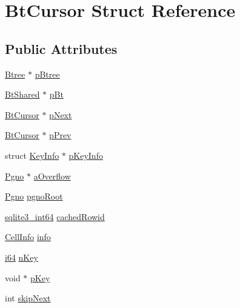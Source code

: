 \hypertarget{struct_bt_cursor}{\section{Bt\-Cursor Struct Reference}
\label{struct_bt_cursor}
}
\subsection*{Public Attributes}
\begin{DoxyCompactItemize}
\item 
\hyperlink{struct_btree}{Btree} $\ast$ \hyperlink{struct_bt_cursor_a2ad810542eaf99c9919c585624bead6f}{p\-Btree}
\item 
\hyperlink{struct_bt_shared}{Bt\-Shared} $\ast$ \hyperlink{struct_bt_cursor_a61c245712549192f7644e5ac23c00b74}{p\-Bt}
\item 
\hyperlink{struct_bt_cursor}{Bt\-Cursor} $\ast$ \hyperlink{struct_bt_cursor_ad2f8fe3aa7d3fa3309692b3e8a8c2395}{p\-Next}
\item 
\hyperlink{struct_bt_cursor}{Bt\-Cursor} $\ast$ \hyperlink{struct_bt_cursor_ac4f788ee88f252ddfcef8804674c7c90}{p\-Prev}
\item 
struct \hyperlink{struct_key_info}{Key\-Info} $\ast$ \hyperlink{struct_bt_cursor_ad2360bda13f959ed70672eb421fdb5ec}{p\-Key\-Info}
\item 
\hyperlink{sqlite3_8c_aec0c653e8dd16e4639caf2f8ea54f55c}{Pgno} $\ast$ \hyperlink{struct_bt_cursor_ae2dbcc15e63d349774a7ad6caef4d096}{a\-Overflow}
\item 
\hyperlink{sqlite3_8c_aec0c653e8dd16e4639caf2f8ea54f55c}{Pgno} \hyperlink{struct_bt_cursor_a0b038f63a5b1b9df0b892e0773ffdd29}{pgno\-Root}
\item 
\hyperlink{sqlite3_8c_a0a4d3e6c1ad46f90e746b920ab6ca0d2}{sqlite3\-\_\-int64} \hyperlink{struct_bt_cursor_ad66b1a006f910aeb12de1e93d9a84cff}{cached\-Rowid}
\item 
\hyperlink{struct_cell_info}{Cell\-Info} \hyperlink{struct_bt_cursor_a9934b348c6e9f4808d8f98ea78788fbe}{info}
\item 
\hyperlink{sqlite3_8c_a2a0f0f4ae7001eb54351f77ea1cdbcfd}{i64} \hyperlink{struct_bt_cursor_a23f6a271258c109aaeda0ba19e808f92}{n\-Key}
\item 
void $\ast$ \hyperlink{struct_bt_cursor_a3c979824f27f63678d7a2b02311bc330}{p\-Key}
\item 
int \hyperlink{struct_bt_cursor_ab1dfdbd6c9ec6cdb21cdb5deaa6d5ecb}{skip\-Next}
\item 

\end{DoxyCompactItemize}
